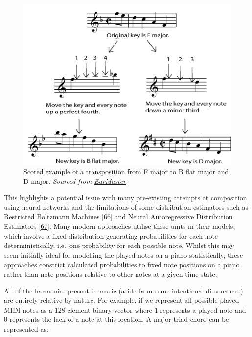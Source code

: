 \documentclass[12pt,]{article}
\begin{document}
\begin{figure}
\centering
\includegraphics[width=\textwidth,height=0.3\textheight]{Images/transp3b.png}
\caption{Scored example of a transposition from F major to B flat major
and D major.
\newline\textit{Sourced from \href{https://www.earmaster.com/music-theory-online/ch06/chapter-6-4.html}{EarMaster}}}
\end{figure}

This highlights a potential issue with many pre-existing attempts at
composition using neural networks and the limitations of some
distribution estimators such as Restricted Boltzmann Machines
{[}\protect\hyperlink{ref-sutskever2009recurrent}{66}{]} and Neural
Autoregressive Distribution Estimators
{[}\protect\hyperlink{ref-uria2016neural}{67}{]}. Many modern approaches
utilise these units in their models, which involve a fixed distribution
generating probabilities for each note deterministically, i.e.~one
probability for each possible note. Whilst this may seem initially ideal
for modelling the played notes on a piano statistically, these
approaches constrict calculated probabilities to fixed note positions on
a piano rather than note positions relative to other notes at a given
time state.

All of the harmonics present in music (aside from some intentional
dissonances) are entirely relative by nature. For example, if we
represent all possible played MIDI notes as a 128-element binary vector
where 1 represents a played note and 0 represents the lack of a note at
this location. A major triad chord can be represented as:
\end{document}
